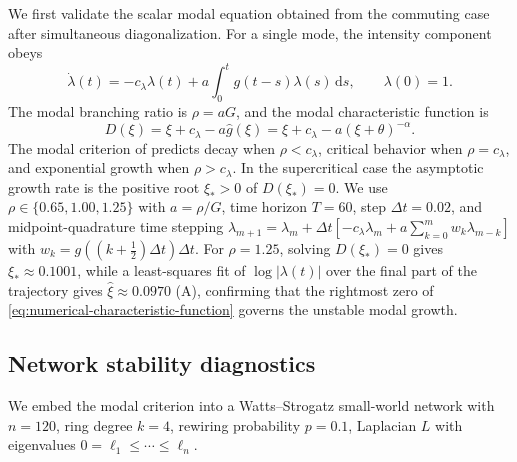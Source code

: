\documentclass[11pt]{article}
\theoremstyle{plain}
\theoremstyle{definition}
\theoremstyle{remark}
\newcommand{\abs}[1]{\left\lvert #1 \right\rvert}
\newcommand{\dd}{\mathrm{d}}
\newcommand{\Laplace}{\widehat}
\newcommand{\branch}{\rho}
\begin{document}
We first validate the scalar modal equation obtained from the commuting case after simultaneous
diagonalization. For a single mode, the intensity component obeys
\begin{equation}
    \dot \lambda(t)
    =
    -c_\lambda \lambda(t)
    +a\int_0^t g(t-s)\lambda(s)\,\dd s,
    \qquad
    \lambda(0)=1.
    \label{eq:numerical-modal-equation}
\end{equation}
The modal branching ratio is $\branch=aG$, and the modal characteristic function is
\begin{equation}
    D(\xi)
    =
    \xi+c_\lambda-a\Laplace g(\xi)
    =
    \xi+c_\lambda-a(\xi+\theta)^{-\alpha}.
    \label{eq:numerical-characteristic-function}
\end{equation}
The modal criterion of  predicts decay when $\branch<c_\lambda$, critical behavior
when $\branch=c_\lambda$, and exponential growth when $\branch>c_\lambda$. In the supercritical
case the asymptotic growth rate is the positive root $\xi_*>0$ of $D(\xi_*)=0$. We use
$\branch\in\{0.65,1.00,1.25\}$ with $a=\branch/G$, time horizon $T=60$, step $\Delta t=0.02$, and
midpoint-quadrature time stepping
$\lambda_{m+1}=\lambda_m+\Delta t[-c_\lambda\lambda_m+a\sum_{k=0}^{m}w_k\lambda_{m-k}]$ with
$w_k=g((k+\tfrac12)\Delta t)\Delta t$. For $\branch=1.25$, solving $D(\xi_*)=0$ gives
$\xi_*\approx0.1001$, while a least-squares fit of $\log\abs{\lambda(t)}$ over the final part of
the trajectory gives $\widehat\xi\approx0.0970$ (A), confirming that
the rightmost zero of \eqref{eq:numerical-characteristic-function} governs the unstable modal
growth.

\subsection{Network stability diagnostics}
\label{subsec:numerical-network-diagnostics}

We embed the modal criterion into a Watts--Strogatz small-world network \cite{watts1998collective} with $n=120$, ring degree
$k=4$, rewiring probability $p=0.1$, Laplacian $L$ with eigenvalues
$0=\ell_1\le\cdots\le\ell_n$.
\end{document}

